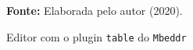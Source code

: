 \begin{figure}[ht!]
\centering

\caption{\textmd{Editor com o plugin \texttt{table} do \texttt{Mbeddr}}}
\label{fig:tableeditor}

\par\medskip\textbf{Fonte:} Elaborada pelo autor (2020).  \par\medskip

\end{figure}

